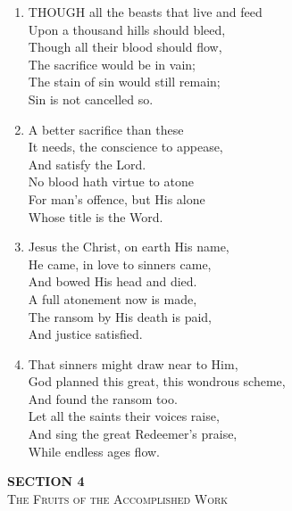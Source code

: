\documentclass[11pt,a4paper]{article}
\begin{document}
\begin{enumerate}
    \item THOUGH all the beasts that live and feed \\
        Upon a thousand hills should bleed, \\
        Though all their blood should flow, \\
        The sacrifice would be in vain; \\
        The stain of sin would still remain; \\
        Sin is not cancelled so.

    \item A better sacrifice than these \\
        It needs, the conscience to appease, \\
        And satisfy the Lord. \\
        No blood hath virtue to atone \\
        For man's offence, but His alone \\
        Whose title is the Word.

    \item Jesus the Christ, on earth His name, \\
        He came, in love to sinners came, \\
        And bowed His head and died. \\
        A full atonement now is made, \\
        The ransom by His death is paid, \\
        And justice satisfied.

    \item That sinners might draw near to Him, \\
        God planned this great, this wondrous scheme, \\
        And found the ransom too. \\
        Let all the saints their voices raise, \\
        And sing the great Redeemer's praise, \\
        While endless ages flow.

\end{enumerate}
\newpage
\thispagestyle{empty}
\vspace*{3.5cm}
\begin{center}
    {\LARGE \textbf{SECTION 4}}\\[0.8em]
    {\Large \textsc{The Fruits of the Accomplished Work}}
\end{center}
\vspace{3.5cm}
\end{document}
